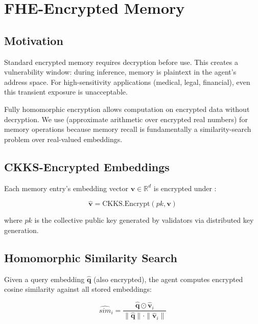 \section{FHE-Encrypted Memory}

\label{sec:fhe}

\subsection{Motivation}

Standard encrypted memory requires decryption before use. This creates a vulnerability window: during inference, memory is plaintext in the agent's address space. For high-sensitivity applications (medical, legal, financial), even this transient exposure is unacceptable.

Fully homomorphic encryption allows computation on encrypted data without decryption. We use \CKKS{} (approximate arithmetic over encrypted real numbers) for memory operations because memory recall is fundamentally a similarity-search problem over real-valued embeddings.

\subsection{CKKS-Encrypted Embeddings}

Each memory entry's embedding vector $\mathbf{v} \in \mathbb{R}^d$ is encrypted under \CKKS{}:

\begin{equation}
\hat{\mathbf{v}} = \text{CKKS.Encrypt}(pk, \mathbf{v})
\end{equation}

where $pk$ is the collective public key generated by \TChain{} validators via distributed key generation.

\subsection{Homomorphic Similarity Search}

Given a query embedding $\hat{\mathbf{q}}$ (also encrypted), the agent computes encrypted cosine similarity against all stored embeddings:

\begin{equation}
\widehat{\textit{sim}}_i = \frac{\hat{\mathbf{q}} \odot \hat{\mathbf{v}}_i}{\|\hat{\mathbf{q}}\| \cdot \|\hat{\mathbf{v}}_i\|}
\end{equation}

